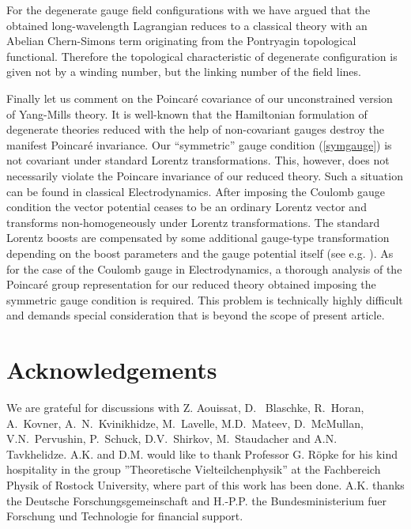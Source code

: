 \documentclass[a4paper,12pt]{article}
\begin{document}
For the degenerate gauge field configurations \coordHE{} with \coordHE{}
we have argued that the obtained long-wavelength Lagrangian reduces to a
classical theory with an Abelian Chern-Simons term originating from the
Pontryagin topological functional.
Therefore the topological characteristic of degenerate
configuration is given not by a winding number,
but the linking number of the field lines.

Finally let us comment on the Poincar\'{e} covariance of our
unconstrained version of Yang-Mills theory. It is well-known that the
Hamiltonian formulation of degenerate theories reduced with the help of
non-covariant gauges destroy the manifest Poincar\'{e} invariance.
Our ``symmetric'' gauge condition (\ref{symgauge})
is not covariant under standard Lorentz transformations.
This, however, does not necessarily violate
the Poincare invariance of our reduced theory.
Such a situation can be found in classical Electrodynamics.
After imposing the Coulomb gauge condition the vector potential
ceases to be an ordinary Lorentz vector and
transforms non-homogeneously under Lorentz transformations.
The standard Lorentz boosts are compensated by some additional
gauge-type transformation depending on the
boost parameters and the gauge potential itself
(see e.g. \cite{BjorkenDrell,HansonReggeTeitelboim,PavelPervushin}).
As for the case of the Coulomb gauge in
Electrodynamics, a thorough analysis of the Poincar\'{e} group representation
for our reduced theory obtained imposing the symmetric gauge condition
is required. This problem is technically highly difficult and demands
special consideration that is beyond the scope of present article.



\section*{Acknowledgements}



We are grateful for discussions with Z. Aouissat, D. ~Blaschke,  R.~Horan,
A.~Kovner, A.~N.~Kvinikhidze,  M.~Lavelle, M.D.~Mateev, D.~McMullan,
V.N.~Pervushin, P.~Schuck, D.V.~Shirkov, M.~Staudacher and  A.N.~ Tavkhelidze.
A.K. and D.M. would like to thank Professor G. R\"opke
for his kind hospitality in the group ''Theoretische Vielteilchenphysik''
at the Fachbereich Physik of Rostock University, where part of this work has
been done. A.K. thanks the Deutsche Forschungsgemeinschaft and
H.-P.P. the Bundesministerium fuer Forschung und Technologie for
financial support.
\end{document}
